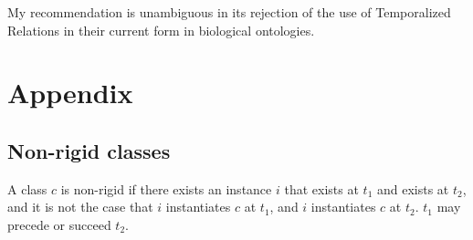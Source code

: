 \documentclass{bioinfo}
\begin{document}
My recommendation is unambiguous in its rejection of the use of
Temporalized Relations in their current form in biological ontologies.





\newpage
\section*{Appendix}

\subsection{Non-rigid classes}

A class $c$ is non-rigid if there exists an instance $i$ that exists
at $t_1$ and exists at $t_2$, and it is not the case that $i$
instantiates $c$ at $t_1$, and $i$ instantiates $c$ at $t_2$. $t_1$
may precede or succeed $t_2$.
\end{document}
